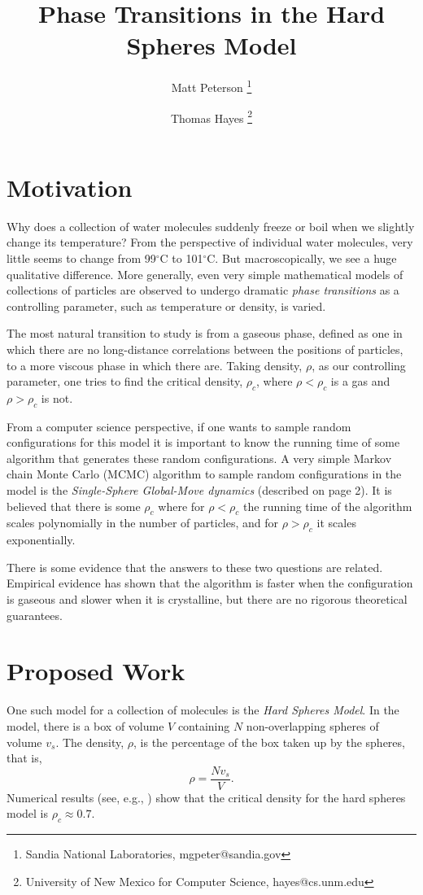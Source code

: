 \documentclass[a4paper,11pt]{article}
\title{Phase Transitions in the Hard Spheres Model}
\author{Matt Peterson \thanks{Sandia National Laboratories, mgpeter@sandia.gov} \and Thomas Hayes \thanks{University of New Mexico for Computer Science, hayes@cs.unm.edu}}
\begin{document}
\maketitle

\section*{Motivation}

Why does a collection of water molecules suddenly freeze or boil when we slightly change its temperature?  From the perspective of individual water molecules, very little seems to change from 99$^\circ$C to 101$^\circ$C.  But macroscopically, we see a huge qualitative difference.  More generally, even very simple mathematical models of collections of particles are observed to undergo dramatic \textit{phase transitions} as a controlling parameter, such as temperature or density, is varied.

The most natural transition to study is from a gaseous phase, defined as one in which there are no long-distance correlations between the positions of particles, to a more viscous phase in which there are.  Taking density, $\rho$, as our controlling parameter, one tries to find the critical density, $\rho_c$, where $\rho < \rho_c$ is a gas and $\rho > \rho_c$ is not.

From a computer science perspective, if one wants to sample random configurations for this model it is important to know the running time of some algorithm that generates these random configurations.  A very simple Markov chain Monte Carlo (MCMC) algorithm to sample random configurations in the model is the \textit{Single-Sphere Global-Move dynamics} (described on page 2).  It is believed that there is some $\rho_c$ where for $\rho < \rho_c$ the running time of the algorithm scales polynomially in the number of particles, and for $\rho > \rho_c$ it scales exponentially.

There is some evidence that the answers to these two questions are related.  Empirical evidence has shown that the algorithm is faster when the configuration is gaseous and slower when it is crystalline, but there are no rigorous theoretical guarantees.

\section*{Proposed Work}

One such model for a collection of molecules is the \textit{Hard Spheres Model}.  In the model, there is a box of volume $V$ containing $N$ non-overlapping spheres of volume $v_s$.  The density, $\rho$, is the percentage of the box taken up by the spheres, that is,
\begin{displaymath}
  \rho = \frac{Nv_s}{V}.
\end{displaymath}
Numerical results (see, e.g., \cite{Mak,Piasecki}) show that the critical density for the hard spheres model is $\rho_c \approx 0.7$.
\end{document}
